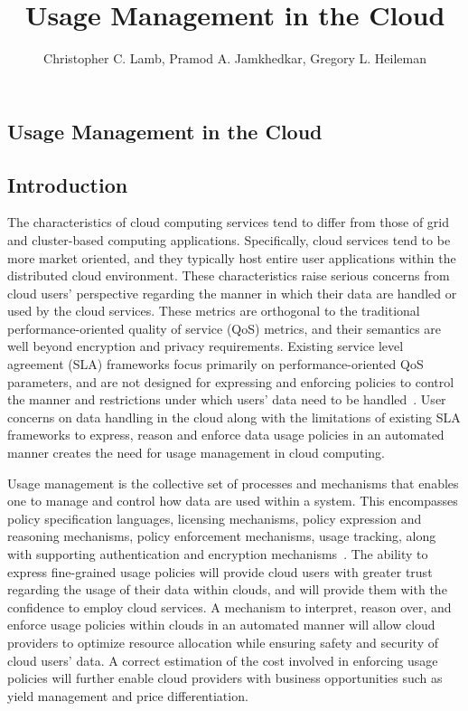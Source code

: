 \documentclass[notitlepage]{book}
\author{Christopher C. Lamb, Pramod A. Jamkhedkar, Gregory L. Heileman}
\title{Usage Management in the Cloud}
\begin{document}
\setlength{\parskip}{0pt}
\let\cleardoublepage\clearpage
{}
\begin{doublespace}
\maketitle 
\tableofcontents
{}
\chapter{Usage Management in the Cloud}
\section{Introduction}
The characteristics of cloud computing services tend to differ from those of grid and cluster-based computing applications.  Specifically, cloud services tend to be more market oriented, and they typically host entire user applications within the distributed cloud environment. These characteristics raise serious concerns from cloud users' perspective regarding the manner in which their data are handled or used by the cloud services. These metrics are orthogonal to the traditional performance-oriented quality of service (QoS) metrics, and their semantics are well beyond encryption and privacy requirements. Existing service level agreement (SLA) frameworks focus primarily on performance-oriented QoS parameters, and are not designed for expressing and enforcing policies to control the manner and restrictions under which users' data need to be handled~\cite{WSLA,WSA,PaRaSh:09,WSP}. User concerns on data handling in the cloud along with the limitations of existing SLA frameworks to express, reason and enforce data usage policies in an automated manner creates the need for usage management in cloud computing. 
 
Usage management is the collective set of processes and mechanisms that enables one to manage and control how data are
used within a system. This encompasses policy specification languages, licensing mechanisms, policy expression and reasoning mechanisms, policy enforcement mechanisms, usage tracking, along with supporting authentication and encryption mechanisms~\cite{JaHeLa:10,PaSa:04}. The ability to express fine-grained usage policies will provide cloud users with greater trust regarding the usage of their data within clouds, and will provide them with the confidence to employ cloud services. A mechanism to interpret, reason over, and enforce usage policies within clouds in an automated manner will allow cloud providers to optimize resource allocation while ensuring safety and security of cloud users' data. A correct estimation of the cost involved in enforcing usage policies will further enable cloud providers with business opportunities such as yield management and price differentiation. 


\end{doublespace}
\end{document}
